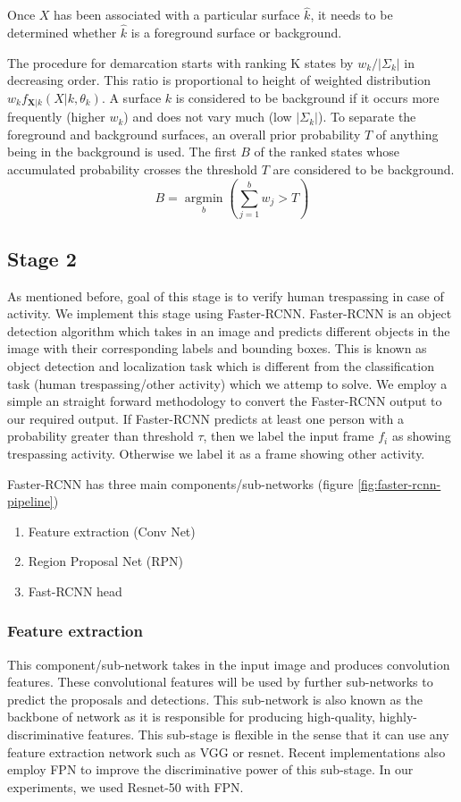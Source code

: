 Once $X$ has been associated with a particular surface $\hat{k}$, it needs to be determined whether $\hat{k}$ is a foreground surface or background. 

The procedure for demarcation starts with ranking K states by $w_k / | \Sigma_k |$ in decreasing order. This ratio is proportional to height of weighted distribution $w_k f_{\mathbf{X}|k}(X|k,\theta_k)$. A surface $k$ is considered to be 
background if it occurs more frequently (higher $w_k$) and does not vary much (low $|\Sigma_k|$).  To separate the foreground and background surfaces, an overall prior probability $T$ of anything being in the background is used. The first $B$ of the ranked  states whose accumulated probability crosses the threshold $T$ are considered to be background. 
$$ B=\operatorname*{argmin}_b (\sum_{j=1}^b w_{j} > T)$$ 

\subsection{Stage 2 }
As mentioned before, goal of this stage is to verify human trespassing in case of activity. We implement this stage using Faster-RCNN\cite{ref_fasterrcnn}. Faster-RCNN is an object detection algorithm which takes in an image and predicts different objects in the image with their corresponding labels and bounding boxes. This is known as object detection and localization task which is different from the classification task (human trespassing/other activity) which we attemp to solve. We employ a simple an straight forward methodology to convert the Faster-RCNN output to our required output. If Faster-RCNN predicts at least one person with a probability greater than threshold $\tau$, then we label the input frame $f_i$ as showing trespassing activity. Otherwise we label it as a frame showing other activity. 

Faster-RCNN has three main components/sub-networks (figure \ref{fig:faster-rcnn-pipeline})
\begin{enumerate}
    \item Feature extraction (Conv Net)
    \item Region Proposal Net (RPN)
    \item Fast-RCNN head
\end{enumerate}

\subsubsection{Feature extraction}
This component/sub-network takes in the input image and produces convolution features. These convolutional features will be used by further sub-networks to predict the proposals and detections. This sub-network is also known as the backbone of network as it is responsible for producing high-quality, highly-discriminative features. This sub-stage is flexible in the sense that it can use any feature extraction network such as VGG or resnet. Recent implementations also employ FPN\cite{lin2017feature} to improve the discriminative power of this sub-stage. In our experiments, we used Resnet-50 with FPN. 


